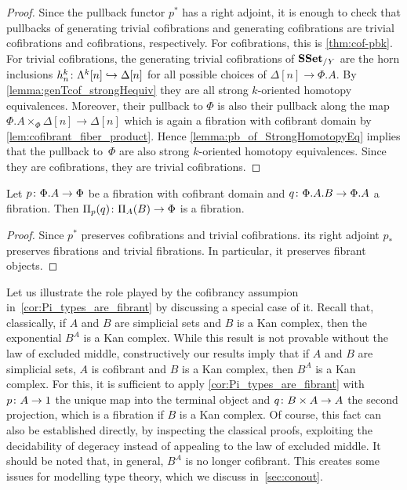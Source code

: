 \documentclass[reqno,10pt,a4paper,oneside,draft]{amsart}
\begin{document}
\begin{proof} Since the pullback functor $p^*$ has a right adjoint,  it is enough to check that pullbacks of generating trivial cofibrations and generating cofibrations are trivial cofibrations and cofibrations, respectively. For cofibrations, this is \cref{thm:cof-pbk}. For trivial cofibrations, the generating trivial cofibrations of $\mathbf{SSet}_{/Y}$ are the horn inclusions $h^k_n \colon \Lambda^{k}[n] \hookrightarrow \Delta[n]$ for all possible choices of $\Delta[n] \rightarrow \Phi.A$. By \cref{lemma:genTcof_strongHequiv} they are all strong $k$-oriented homotopy equivalences. Moreover, their pullback to $\Phi$ is also their pullback along the map $\Phi.A \times_\Phi \Delta[n] \rightarrow \Delta[n]$ which is again a fibration with cofibrant domain by \cref{lem:cofibrant_fiber_product}. Hence  \cref{lemma:pb_of_StrongHomotopyEq} implies that the pullback 
to~$\Phi$ are also strong $k$-oriented homotopy equivalences. Since they are cofibrations, they are trivial cofibrations.
\end{proof}

\begin{corollary}\label{cor:Pi_types_are_fibrant}
Let $p \colon \Phi.A \rightarrow \Phi$ be a fibration with cofibrant domain and $q \colon \Phi.A.B \rightarrow \Phi.A$ a fibration. Then $\Pi_p(q) \colon \Pi_A(B) \rightarrow \Phi$ is a fibration.
\end{corollary}

\begin{proof}
Since $p^*$ preserves cofibrations and trivial cofibrations. its right adjoint $p_*$ preserves fibrations and trivial fibrations. In particular, it preserves fibrant objects.
\end{proof}


Let us illustrate the role played by the cofibrancy assumpion in~\cref{cor:Pi_types_are_fibrant} by discussing
a special case of it. Recall that, classically,  if $A$ and $B$ are simplicial
sets and $B$ is a Kan complex, then the exponential $B^A$ is a Kan complex. While this result is
not provable without the law of excluded middle, constructively our results imply that if $A$ and $B$ are simplicial sets, $A$ is cofibrant and $B$ is a Kan complex, then $B^A$ is a Kan complex. For this, it is sufficient to apply \cref{cor:Pi_types_are_fibrant}
with $p \colon A \to 1$ the unique map into the terminal object and $q \colon B \times A \to A$ the second projection, which is a fibration if $B$ is a Kan complex. Of course, this fact can also be established directly, by inspecting the classical proofs, exploiting the decidability of degeracy instead of appealing to the law of excluded middle.
It should be noted that, in general, $B^A$ is no longer cofibrant. This creates some issues for modelling type
theory, which we discuss in~\cref{sec:conout}.
\end{document}
